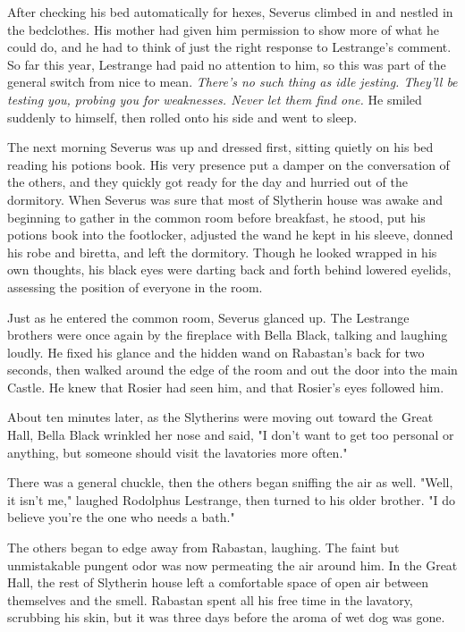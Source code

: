 After checking his bed automatically for hexes, Severus climbed in and nestled in the bedclothes. His mother had given him permission to show more of what he could do, and he had to think of just the right response to Lestrange's comment. So far this year, Lestrange had paid no attention to him, so this was part of the general switch from nice to mean. \emph{There's no such thing as idle jesting. They'll be testing you, probing you for weaknesses. Never let them find one.} He smiled suddenly to himself, then rolled onto his side and went to sleep.

The next morning Severus was up and dressed first, sitting quietly on his bed reading his potions book. His very presence put a damper on the conversation of the others, and they quickly got ready for the day and hurried out of the dormitory. When Severus was sure that most of Slytherin house was awake and beginning to gather in the common room before breakfast, he stood, put his potions book into the footlocker, adjusted the wand he kept in his sleeve, donned his robe and biretta, and left the dormitory. Though he looked wrapped in his own thoughts, his black eyes were darting back and forth behind lowered eyelids, assessing the position of everyone in the room.

Just as he entered the common room, Severus glanced up. The Lestrange brothers were once again by the fireplace with Bella Black, talking and laughing loudly. He fixed his glance and the hidden wand on Rabastan's back for two seconds, then walked around the edge of the room and out the door into the main Castle. He knew that Rosier had seen him, and that Rosier's eyes followed him.

About ten minutes later, as the Slytherins were moving out toward the Great Hall, Bella Black wrinkled her nose and said, "I don't want to get too personal or anything, but someone should visit the lavatories more often."

There was a general chuckle, then the others began sniffing the air as well. "Well, it isn't me," laughed Rodolphus Lestrange, then turned to his older brother. "I do believe you're the one who needs a bath."

The others began to edge away from Rabastan, laughing. The faint but unmistakable pungent odor was now permeating the air around him. In the Great Hall, the rest of Slytherin house left a comfortable space of open air between themselves and the smell. Rabastan spent all his free time in the lavatory, scrubbing his skin, but it was three days before the aroma of wet dog was gone.

